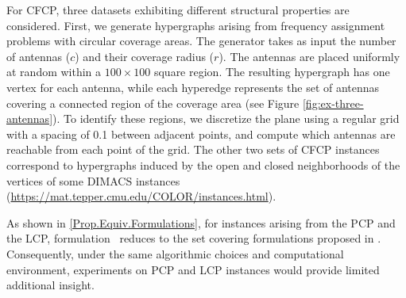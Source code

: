 \documentclass[preprint, 11pt, authoryear]{elsarticle}
\newcommand{\setcoveringform}{\text{DPCP-SCF}}
\begin{document}
For CFCP, three datasets exhibiting different structural properties are considered. 
First, we generate hypergraphs arising from frequency assignment problems with circular coverage areas. 
The generator takes as input the number of antennas ($c$) and their coverage radius ($r$). 
The antennas are placed uniformly at random within a $100 \times 100$ square region. 
The resulting hypergraph has one vertex for each antenna, while each hyperedge represents the set of antennas covering a connected region of the coverage area (see Figure \ref{fig:ex-three-antennas}). 
To identify these regions, we discretize the plane using a regular grid with a spacing of 0.1 between adjacent points, and compute which antennas are reachable from each point of the grid.
 The other two sets of CFCP instances correspond to
hypergraphs induced by the open and closed neighborhoods of the vertices of some DIMACS instances (\url{https://mat.tepper.cmu.edu/COLOR/instances.html}). 

As shown in \ref{Prop.Equiv.Formulations}, for instances arising from the PCP and the LCP, formulation \setcoveringform\ reduces to the set covering formulations proposed in \cite{Furini2018,Lucci2024}.
Consequently, under the same algorithmic choices and computational environment, experiments on PCP and LCP instances would provide limited additional insight.
\end{document}
